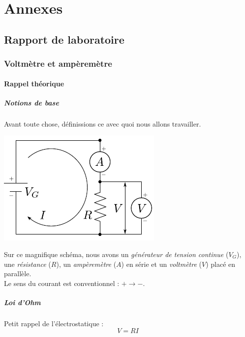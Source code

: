 \documentclass	[11pt, a4paper, openany]{book}
\begin{document}

\appendix
\part{Annexes}
\chapter{Rapport de laboratoire}
\section{Voltmètre et ampèremètre}
\subsection{Rappel théorique}
\subsubsection{Notions de base}
Avant toute chose, définissions ce avec quoi nous allons travailler.
\begin{center}
\includegraphics[scale=0.5]{labo/image8.png}
\end{center}
Sur ce magnifique schéma, nous avons un \textit{générateur de tension continue} ($V_G$), une \textit{résistance} ($R$), un \textit{ampèremètre} ($A$) en série et un \textit{voltmètre} ($V$) placé en parallèle.\\
Le sens du courant est conventionnel : $+ \rightarrow -$.

\subsubsection*{Loi d'Ohm}
Petit rappel de l'électrostatique :
\begin{equation}
V = RI
\end{equation}
\end{document}

